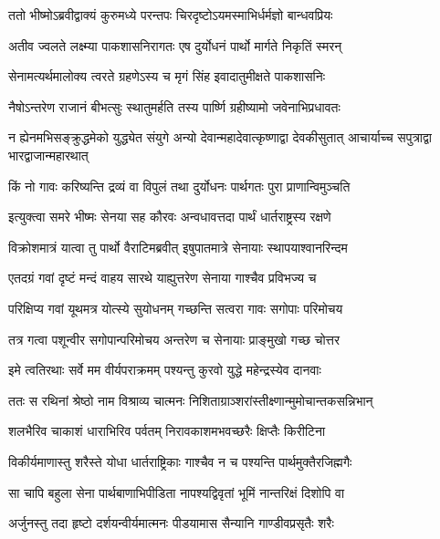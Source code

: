 \twolineshloka
{ततो भीष्मोऽब्रवीद्वाक्यं कुरुमध्ये परन्तपः}
{चिरदृष्टोऽयमस्माभिर्धर्मज्ञो बान्धवप्रियः}



\twolineshloka
{अतीव ज्वलते लक्ष्म्या पाकशासनिरागतः}
{एष दुर्योधनं पार्थो मार्गते निकृतिं स्मरन्}


\twolineshloka
{सेनामत्यर्थमालोक्य त्वरते ग्रहणेऽस्य च}
{मृगं सिंह इवादातुमीक्षते पाकशासनिः}


\twolineshloka
{नैषोऽन्तरेण राजानं बीभत्सुः स्थातुमर्हति}
{तस्य पार्ष्णि ग्रहीष्यामो जवेनाभिप्रधावतः}


\threelineshloka
{न ह्येनमभिसङ्क्रुद्धमेको युद्ध्येत संयुगे}
{अन्यो देवान्महादेवात्कृष्णाद्वा देवकीसुतात्}
{आचार्याच्च सपुत्राद्वा भारद्वाजान्महारथात्}


\twolineshloka
{किं नो गावः करिष्यन्ति द्रव्यं वा विपुलं तथा}
{दुर्योधनः पार्थगतः पुरा प्राणान्विमुञ्चति}



\twolineshloka
{इत्युक्त्वा समरे भीष्मः सेनया सह कौरवः}
{अन्वधावत्तदा पार्थं धार्तराष्ट्रस्य रक्षणे}


\twolineshloka
{विक्रोशमात्रं यात्वा तु पार्थो वैराटिमब्रवीत्}
{इषुपातमात्रे सेनायाः स्थापयाश्वानरिन्दम}


\twolineshloka
{एतदग्रं गवां दृष्टं मन्दं वाहय सारथे}
{याह्युत्तरेण सेनाया गाश्चैव प्रविभज्य च}


\twolineshloka
{परिक्षिप्य गवां यूथमत्र योत्स्ये सुयोधनम्}
{गच्छन्ति सत्वरा गावः सगोपाः परिमोचय}


\twolineshloka
{तत्र गत्वा पशून्वीर सगोपान्परिमोचय}
{अन्तरेण च सेनायाः प्राङ्मुखो गच्छ चोत्तर}


\twolineshloka
{इमे त्वतिरथाः सर्वे मम वीर्यपराक्रमम्}
{पश्यन्तु कुरवो युद्धे महेन्द्रस्येव दानवाः}



\twolineshloka
{ततः स रथिनां श्रेष्ठो नाम विश्राव्य चात्मनः}
{निशिताग्राञ्शरांस्तीक्ष्णान्मुमोचान्तकसन्निभान्}


\twolineshloka
{शलभैरिव चाकाशं धाराभिरिव पर्वतम्}
{निरावकाशमभवच्छरैः क्षिप्तैः किरीटिना}


\twolineshloka
{विकीर्यमाणास्तु शरैस्ते योधा धार्तराष्ट्रिकाः}
{गाश्चैव न च पश्यन्ति पार्थमुक्तैरजिह्मगैः}


\twolineshloka
{सा चापि बहुला सेना पार्थबाणाभिपीडिता}
{नापश्यद्विवृतां भूमिं नान्तरिक्षं दिशोपि वा}


\twolineshloka
{अर्जुनस्तु तदा हृष्टो दर्शयन्वीर्यमात्मनः}
{पीडयामास सैन्यानि गाण्डीवप्रसृतैः शरैः}


